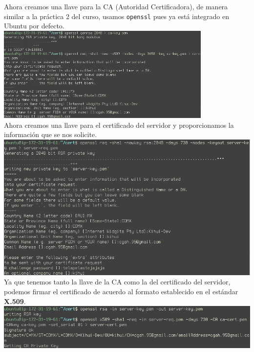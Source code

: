 \documentclass[9pt]{article}
\begin{document}
Ahora creamos una llave para la \textsf{CA} (Autoridad Certificadora), de manera similar a la práctica 2 del curso,  usamos \texttt{openssl} pues ya está integrado en \textsf{Ubuntu} por defecto. \\
\includegraphics[width=0.8\textwidth]{mysql_cert}\\

Ahora creamos una llave para el certificado del servidor y proporcionamos la información que se nos solicite. \\
\includegraphics[width=\textwidth]{mysql_server-key}\\

Ya que tenemos tanto la llave de la \textsf{CA} como la del certificado del servidor, podemos firmar el certificado de acuerdo al formato establecido en el estándar \textbf{X.509}. \\
\includegraphics[width=\textwidth]{mysql_server-cert}\\
\end{document}
